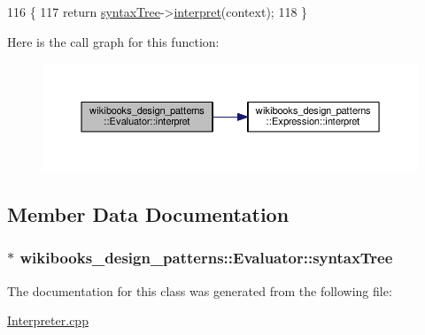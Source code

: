 \begin{DoxyCode}
116                                \{
117         \textcolor{keywordflow}{return} \hyperlink{classwikibooks__design__patterns_1_1Evaluator_a22439cc7dc84a90b755c2955c8c4ac74}{syntaxTree}->\hyperlink{structwikibooks__design__patterns_1_1Expression_a3723a35bb367b43edf806be72385c680}{interpret}(context);
118     \}
\end{DoxyCode}


Here is the call graph for this function\+:
\nopagebreak
\begin{figure}[H]
\begin{center}
\leavevmode
\includegraphics[width=350pt]{classwikibooks__design__patterns_1_1Evaluator_aa7ba308eda08d2fbff093f684f7a0832_cgraph}
\end{center}
\end{figure}




\subsection{Member Data Documentation}
\subsubsection[{\texorpdfstring{syntax\+Tree}{syntaxTree}}]{$\ast$ wikibooks\+\_\+design\+\_\+patterns\+::\+Evaluator\+::syntax\+Tree\hspace{0.3cm}{\ttfamily [private]}}\hypertarget{classwikibooks__design__patterns_1_1Evaluator_a22439cc7dc84a90b755c2955c8c4ac74}{}\label{classwikibooks__design__patterns_1_1Evaluator_a22439cc7dc84a90b755c2955c8c4ac74}


The documentation for this class was generated from the following file\+:\begin{DoxyCompactItemize}
\item 
\hyperlink{Interpreter_8cpp}{Interpreter.\+cpp}\end{DoxyCompactItemize}
